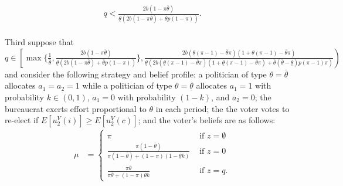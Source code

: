 \documentclass[11pt,english]{article}
\begin{document}
\begin{align*}
 q < \frac{2b (1 - \pi \overline{\theta})}{\underline{\theta}(2b(1-\pi \overline{\theta})+\overline{\theta}p(1-\pi))}.
\end{align*}
\\
Third suppose that $q \in \left[ \max\{\frac{1}{\overline{\theta}},\frac{2b (1 - \pi \overline{\theta})}{\underline{\theta}(2b(1-\pi \overline{\theta})+\overline{\theta}p(1-\pi))}\}, \frac{2b(\underline{\theta}(\pi - 1)-\overline{\theta}\pi)(1+\underline{\theta}(\pi - 1)-\overline{\theta}\pi)}{\underline{\theta}\left(2b(\underline{\theta}(\pi - 1)-\overline{\theta}\pi)(1+\underline{\theta}(\pi - 1)-\overline{\theta}\pi) + \overline{\theta}(\overline{\theta}-\underline{\theta})p(\pi-1)\pi\right)}\right)$ and consider the following strategy and belief profile: a politician of type $\theta = \overline{\theta}$ allocates $a_1 = a_2 = 1$ while a politician of type $\theta = \underline{\theta}$ allocates $a_1 = 1$ with probability $k \in (0,1)$, $a_1 = 0$ with probability $(1-k)$, and $a_2 = 0$; the bureaucrat exerts effort proportional to $\theta$ in each period; the the voter votes to re-elect if $E[u_2^V(i)] \geq E[u_2^V(c)]$; and the voter's beliefs are as follows:
\begin{align}\label{mu3}
\mu &= \begin{cases}
\pi & \text{ if } z = \emptyset\\
\frac{\pi (1-\overline{\theta})}{\pi (1-\overline{\theta}) + (1-\pi)(1-\underline{\theta}k)} & \text{ if }z = 0\\
\frac{\pi \overline{\theta}}{\pi \overline{\theta} + (1-\pi)\underline{\theta}k} & \text { if } z= q.
\end{cases}
\end{align}
\end{document}
